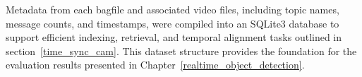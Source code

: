\documentclass{erauthesis}
\begin{document}
Metadata from each bagfile and associated video files, including topic names, message counts, and timestamps, were compiled into an SQLite3 database to support efficient indexing, retrieval, and temporal alignment tasks outlined in section~\ref{time_sync_cam}.
This dataset structure provides the foundation for the evaluation results presented in Chapter~\ref{realtime_object_detection}.





\end{document}
